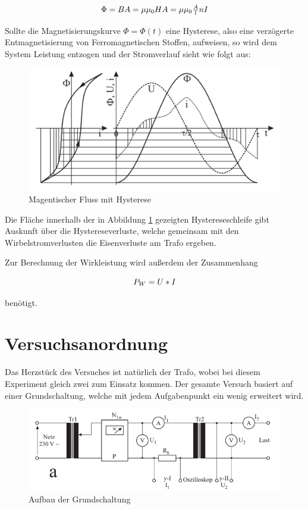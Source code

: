 \documentclass[12pt,a4paper,twoside]{article}
\begin{document}
\begin{equation}
    \label{eq:Magnetischer Fluss}
    \centerline{$\Phi = BA = \mu \mu_{0} HA = \mu \mu_{0} \frac{A}{l} nI$}
\end{equation}

\noindent
Sollte die Magnetisierungskurve $\Phi = \Phi(t)$ eine Hysterese, also eine verzögerte Entmagnetisierung von Ferromagnetischen Stoffen, aufweisen, so wird dem System Leistung entzogen und der Stromverlauf sieht wie folgt aus:

\begin{figure}[H]
    \centering
    \includegraphics[width=0.5\linewidth]{nudes/GL-Hysterese.png}
    \caption{Magentischer Fluss mit Hysterese}
    \label{fig:Hystere}
\end{figure}

\noindent
Die Fläche innerhalb der in Abbildung \ref{fig:Hystere} gezeigten Hystereseschleife gibt Auskunft über die Hystereseverluste, welche gemeinsam mit den Wirbelstromverlusten die Eisenverluste am Trafo ergeben. \newline

\noindent
Zur Berechnung der Wirkleistung wird außerdem der Zusammenhang

\begin{equation}
    \label{eq:Wirkleistung}
    \centerline{$P_{W} = U*I$}
\end{equation}

\noindent
benötigt.


\section{Versuchsanordnung} %

Das Herzstück des Versuches ist natürlich der Trafo, wobei bei diesem Experiment gleich zwei zum Einsatz kommen. Der gesamte Versuch basiert auf einer Grundschaltung, welche mit jedem Aufgabenpunkt ein wenig erweitert wird.

    \begin{figure}[H]
        \centering
        \includegraphics[width=0.6\linewidth, angle=0]{nudes/Versuchsaufbau a.png}
        \caption{Aufbau der Grundschaltung}
        \label{fig:AufbauDerGrundschaltung}
    \end{figure}
\end{document}
